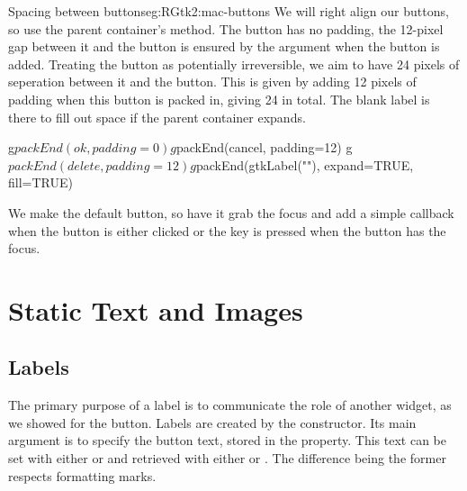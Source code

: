 \begin{example}{Spacing between buttons}{eg:RGtk2:mac-buttons}
We will right align our buttons, so use the parent container's
 method. The  button has no padding, the
12-pixel gap between it and the  button is ensured by  the
 argument when the  button is
added. Treating the  button as potentially irreversible,
we aim to have 24 pixels of seperation between it and the
 button. This is given by adding 12 pixels of padding
when this button is packed in, giving 24 in total. The blank label is
there to fill out space if the parent container expands.
\begin{Schunk}
\begin{Sinput}
 g$packEnd(ok, padding=0)
 g$packEnd(cancel, padding=12)
 g$packEnd(delete, padding=12)
 g$packEnd(gtkLabel(""), expand=TRUE, fill=TRUE)
\end{Sinput}
\end{Schunk}
We make  the default button, so have it grab the focus and
add a simple callback when the button is either clicked or the
 key is pressed when the button has the focus.
\begin{Schunk}
\end{Schunk}






\end{example}

\section{Static Text and Images}

\subsection{Labels}
\label{sec:RGtk2:gtkLabel}

The primary purpose of a label is to communicate the role of another
widget, as we showed for the button. Labels are created by the
 constructor. Its main argument is
 to specify the button text, stored in the
 property. This text can be set with either
 or  and
retrieved with either  or
.  The difference being the former
respects formatting marks.

